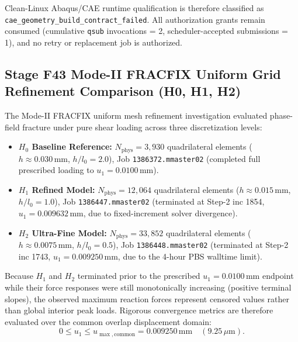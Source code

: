 Clean-Linux Abaqus/CAE runtime qualification is therefore classified as \texttt{cae\_geometry\_build\_contract\_failed}. All authorization grants remain consumed (cumulative \texttt{qsub} invocations = 2, scheduler-accepted submissions = 1), and no retry or replacement job is authorized.

\subsection{Stage F43 Mode-II FRACFIX Uniform Grid Refinement Comparison (H0, H1, H2)}

The Mode-II FRACFIX uniform mesh refinement investigation evaluated phase-field fracture under pure shear loading across three discretization levels:
\begin{itemize}
    \item \textbf{$H_0$ Baseline Reference:} $N_{\text{phys}} = 3,930$ quadrilateral elements ($h \approx 0.030\,\text{mm}$, $h/l_0 = 2.0$), Job \texttt{1386372.mmaster02} (completed full prescribed loading to $u_1 = 0.0100\,\text{mm}$).
    \item \textbf{$H_1$ Refined Model:} $N_{\text{phys}} = 12,064$ quadrilateral elements ($h \approx 0.015\,\text{mm}$, $h/l_0 = 1.0$), Job \texttt{1386447.mmaster02} (terminated at Step-2 inc 1854, $u_1 = 0.009632\,\text{mm}$, due to fixed-increment solver divergence).
    \item \textbf{$H_2$ Ultra-Fine Model:} $N_{\text{phys}} = 33,852$ quadrilateral elements ($h \approx 0.0075\,\text{mm}$, $h/l_0 = 0.5$), Job \texttt{1386448.mmaster02} (terminated at Step-2 inc 1743, $u_1 = 0.009250\,\text{mm}$, due to the 4-hour PBS walltime limit).
\end{itemize}

Because $H_1$ and $H_2$ terminated prior to the prescribed $u_1 = 0.0100\,\text{mm}$ endpoint while their force responses were still monotonically increasing (positive terminal slopes), the observed maximum reaction forces represent censored values rather than global interior peak loads. Rigorous convergence metrics are therefore evaluated over the common overlap displacement domain:
\begin{equation}
    0 \le u_1 \le u_{\max,\text{common}} = 0.009250\,\text{mm} \quad (9.25\,\mu\text{m}).
\end{equation}

